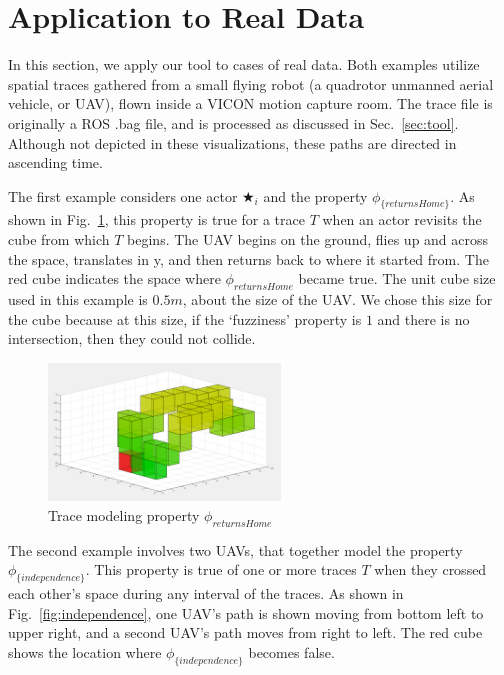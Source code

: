\section{Application to Real Data}
\label{sec:application}

In this section, we apply our tool to cases of real data.
Both examples utilize spatial traces gathered from a small flying robot (a quadrotor unmanned aerial vehicle, or UAV), flown inside a VICON motion capture room.
The trace file is originally a ROS .bag file, and is processed as discussed in Sec.~\ref{sec:tool}. 
Although not depicted in these visualizations, these paths are directed in ascending time. 

The first example considers one actor $\bigstar_i$ and the property $\phi_{\{returnsHome\}}$.  
As shown in Fig.~\ref{fig:returnsHome}, this property is true for a trace $T$ when an actor revisits the cube from which $T$ begins.
The UAV begins on the ground, flies up and across the space, translates in y, and then returns back to where it started from.
The red cube indicates the space where $\phi_{returnsHome}$ became true.
The unit cube size used in this example is $0.5m$, about the size of the UAV.
We chose this size for the cube because at this size, if the `fuzziness' property is $1$ and there is no intersection, then they could not collide.


\begin{figure}
  \centering
  \includegraphics[width=0.55\textwidth]{./figures/returnsHome}
    \caption{Trace modeling property $\phi_{returnsHome}$}
    \label{fig:returnsHome}
\end{figure}

The second example involves two UAVs, that together model the property $\phi_{\{independence\}}$.
This property is true of one or more traces $T$ when they crossed each other's space during any interval of the traces.
As shown in Fig.~\ref{fig:independence}, one UAV's path is shown moving from bottom left to upper right, and a second UAV's path moves from right to left.
The red cube shows the location where $\phi_{\{independence\}}$ becomes false.

